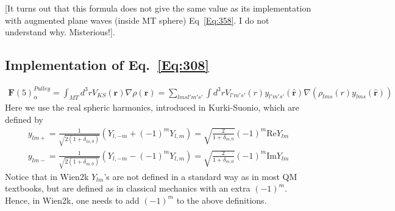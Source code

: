 \documentclass[aps,prb,floatfix,epsfig,singlecolumn,showpacs,preprintnumbers]{revtex4}
\newcommand{\vF}{{\mathbf{F}}}
\renewcommand{\vr}{{\mathbf{r}}}
\renewcommand{\Im}{\textrm{Im}}
\renewcommand{\Re}{\textrm{Re}}
\begin{document}
[It turns out that this formula does not give the same value as its
implementation with augmented plane waves (inside MT sphere) Eq~\ref{Eq:358}. I do not
understand why. Misterious!].

\subsection{Implementation of Eq.~\ref{Eq:308}}

\begin{eqnarray}
\vF(5)^{Pulley}_\alpha=\int_{MT} d^3r V_{KS}(\vr) \nabla\rho(\vr) =
\sum_{l m s l' m' s'}\int d^3r  V_{l'm' s'}(r) y_{l'm's'}(\hat{\vr}) \nabla (\rho_{lms}(r) y_{lms}(\hat{\vr}))
\end{eqnarray}
Here we use the real spheric harmonics, introduced in Kurki-Suonio,
which are defined by
\begin{eqnarray}
y_{lm+} = \frac{1}{\sqrt{2(1+\delta_{m,0})}}(Y_{l,-m}+(-1)^m  Y_{l,m})=\sqrt{\frac{2}{1+\delta_{m,0}}}(-1)^m \Re Y_{lm}\\
y_{lm-} = \frac{1}{\sqrt{2(1+\delta_{m,0})}}(Y_{l,-m}-(-1)^m  Y_{l,m}) =\sqrt{\frac{2}{1+\delta_{m,0}}}(-1)^m \Im Y_{lm}
\end{eqnarray}
Notice that in Wien2k $Y_{lm}$'s are not defined in a standard way as
in most QM textbooks, but are defined as in classical mechanics with
an extra $(-1)^m$. Hence, in Wien2k, one needs to add $(-1)^m$ to the
above definitions.
\end{document}
